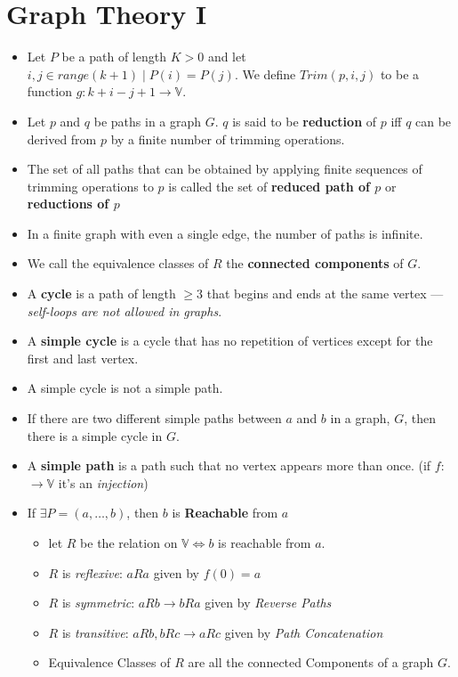 \documentclass[12pt]{scrartcl}
\begin{document}
\section{Graph Theory I}
\begin{itemize}
    \item Let $P$ be a path of length $K > 0$ and let $i,j \in range(k+1) \mid P(i) = P(j)$. We define $Trim(p,i,j)$ to be a function $g: k + i - j + 1 \rightarrow \mathbb{V}$.
    \item Let $p$ and $q$ be paths in a graph $G$. $q$ is said to be \textbf{reduction} of $p$ iff $q$ can be derived from $p$ by a finite number of trimming operations.
    \item The set of all paths that can be obtained by applying finite sequences of trimming operations to $p$ is called the set of \textbf{reduced path of $p$} or \textbf{reductions of $p$}
    \item In a finite graph with even a single edge, the number of paths is infinite.
    \item We call the equivalence classes of $R$ the \textbf{connected components} of $G$.
    \item A \textbf{cycle} is a path of length $\geq 3$ that begins and ends at the same vertex --- \textit{self-loops are not allowed in graphs}.
    \item A \textbf{simple cycle} is a cycle that has no repetition of vertices except for the first and last vertex.
    \item A simple cycle is not a simple path.
    \item If there are two different simple paths between $a$ and $b$ in a graph, $G$, then there is a simple cycle in $G$.
    \item A \textbf{simple path} is a path such that no vertex appears more than once. (if $f:$$\rightarrow \mathbb{V}$ it's an \textit{injection})
    \item If $\exists P = (a,\ldots, b)$, then $b$ is \textbf{Reachable}  from $a$

        \begin{itemize}
            \item let $R$ be the relation on $\mathbb{V} \iff b$ is reachable from $a$.
            \item $R$ is \textit{reflexive}: $aRa$ given by $f(0) = a$
            \item $R$ is \textit{symmetric}: $aRb \to bRa$ given by \textit{Reverse Paths}
            \item $R$ is \textit{transitive}: $aRb, bRc \to aRc$ given by \textit{Path Concatenation}
            \item Equivalence Classes of $R$ are all the connected Components of a graph $G$.
        \end{itemize}


\end{itemize}
\end{document}

